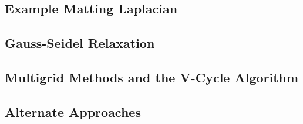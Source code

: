 \subsection{Example Matting Laplacian}

\subsection{Gauss-Seidel Relaxation}

\subsection{Multigrid Methods and the V-Cycle Algorithm}

\subsection{Alternate Approaches}
